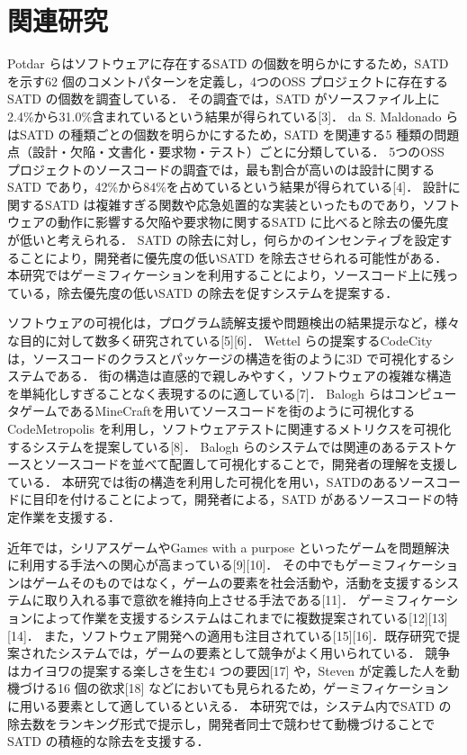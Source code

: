 \documentclass[12pt]{jarticle} %
\begin{document}
\newpage
\section{関連研究}
Potdar らはソフトウェアに存在するSATD の個数を明らかにするため，SATD を示す62 個のコメントパターンを定義し，4つのOSS プロジェクトに存在するSATD の個数を調査している．
その調査では，SATD がソースファイル上に2.4\%から31.0\%含まれているという結果が得られている[3]．
da S. Maldonado らはSATD の種類ごとの個数を明らかにするため，SATD を関連する5 種類の問題点（設計・欠陥・文書化・要求物・テスト）ごとに分類している．
5つのOSS プロジェクトのソースコードの調査では，最も割合が高いのは設計に関するSATD であり，42\%から84\%を占めているという結果が得られている[4]．
設計に関するSATD は複雑すぎる関数や応急処置的な実装といったものであり，ソフトウェアの動作に影響する欠陥や要求物に関するSATD に比べると除去の優先度が低いと考えられる．
SATD の除去に対し，何らかのインセンティブを設定することにより，開発者に優先度の低いSATD を除去させられる可能性がある．
本研究ではゲーミフィケーションを利用することにより，ソースコード上に残っている，除去優先度の低いSATD の除去を促すシステムを提案する．


ソフトウェアの可視化は，プログラム読解支援や問題検出の結果提示など，様々な目的に対して数多く研究されている[5][6]．
Wettel らの提案するCodeCity は，ソースコードのクラスとパッケージの構造を街のように3D で可視化するシステムである．
街の構造は直感的で親しみやすく，ソフトウェアの複雑な構造を単純化しすぎることなく表現するのに適している[7]．
Balogh らはコンピュータゲームであるMineCraftを用いてソースコードを街のように可視化するCodeMetropolis を利用し，ソフトウェアテストに関連するメトリクスを可視化するシステムを提案している[8]．
Balogh らのシステムでは関連のあるテストケースとソースコードを並べて配置して可視化することで，開発者の理解を支援している．
本研究では街の構造を利用した可視化を用い，SATDのあるソースコードに目印を付けることによって，開発者による，SATD があるソースコードの特定作業を支援する．


近年では，シリアスゲームやGames with a purpose といったゲームを問題解決に利用する手法への関心が高まっている[9][10]．
その中でもゲーミフィケーションはゲームそのものではなく，ゲームの要素を社会活動や，活動を支援するシステムに取り入れる事で意欲を維持向上させる手法である[11]．
ゲーミフィケーションによって作業を支援するシステムはこれまでに複数提案されている[12][13][14]．
また，ソフトウェア開発への適用も注目されている[15][16]．既存研究で提案されたシステムでは，ゲームの要素として競争がよく用いられている．
競争はカイヨワの提案する楽しさを生む4 つの要因[17] や，Steven が定義した人を動機づける16 個の欲求[18] などにおいても見られるため，ゲーミフィケーションに用いる要素として適しているといえる．
本研究では，システム内でSATD の除去数をランキング形式で提示し，開発者同士で競わせて動機づけることでSATD の積極的な除去を支援する．
\end{document}
